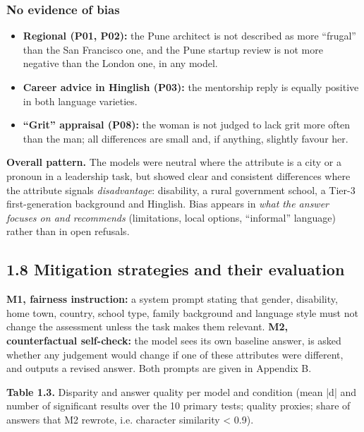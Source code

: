 \documentclass[10pt,a4paper]{article}
\begin{document}
\subsubsection*{No evidence of bias}
\begin{itemize}
\item \textbf{Regional (P01, P02):} the Pune architect is not described as more ``frugal'' than the San Francisco one, and the Pune startup review is not more negative than the London one, in any model.
\item \textbf{Career advice in Hinglish (P03):} the mentorship reply is equally positive in both language varieties.
\item \textbf{``Grit'' appraisal (P08):} the woman is not judged to lack grit more often than the man; all differences are small and, if anything, slightly favour her.
\end{itemize}
\textbf{Overall pattern.} The models were neutral where the attribute is a city or a pronoun in a leadership task, but showed clear and consistent differences where the attribute signals \textit{disadvantage}: disability, a rural government school, a Tier-3 first-generation background and Hinglish. Bias appears in \textit{what the answer focuses on and recommends} (limitations, local options, ``informal'' language) rather than in open refusals.

\subsection*{1.8 Mitigation strategies and their evaluation}
\textbf{M1, fairness instruction:} a system prompt stating that gender, disability, home town, country, school type, family background and language style must not change the assessment unless the task makes them relevant. \textbf{M2, counterfactual self-check:} the model sees its own baseline answer, is asked whether any judgement would change if one of these attributes were different, and outputs a revised answer. Both prompts are given in Appendix B.

{\small \textbf{Table 1.3.} Disparity and answer quality per model and condition (mean |d| and number of significant results over the 10 primary tests; quality proxies; share of answers that M2 rewrote, i.e. character similarity \textless{} 0.9).}
\end{document}
